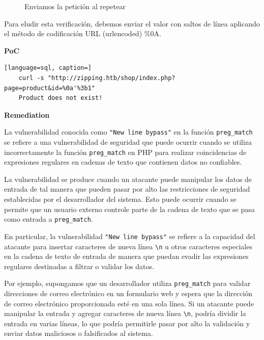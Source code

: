 \documentclass[a4paper]{article} %
\begin{document}
    \begin{figure}[h]
	\centering
	\setlength{\fboxrule}{0.5pt}
	\caption{Enviamos la petición al repetear}
    \end{figure}

    Para eludir esta verificación, debemos enviar el valor con saltos de línea aplicando el método de codificación URL (urlencoded) \%0A.

    \textbf{PoC}

    \begin{lstlisting}[language=sql, caption=]
    curl -s "http://zipping.htb/shop/index.php?page=product&id=%0a'%3b1"
    Product does not exist!
    \end{lstlisting}

    \clearpage
    \textbf{Remediation}

    La vulnerabilidad conocida como \verb|"New line bypass"| en la función \texttt{preg\_match} se refiere a una vulnerabilidad de seguridad que puede ocurrir cuando se utiliza incorrectamente la función \texttt{preg\_match} en PHP para realizar coincidencias de expresiones regulares en cadenas de texto que contienen datos no confiables.

    La vulnerabilidad se produce cuando un atacante puede manipular los datos de entrada de tal manera que pueden pasar por alto las restricciones de seguridad establecidas por el desarrollador del sistema. Esto puede ocurrir cuando se permite que un usuario externo controle parte de la cadena de texto que se pasa como entrada a \texttt{preg\_match}.

    En particular, la vulnerabilidad \verb|"New line bypass"| se refiere a la capacidad del atacante para insertar caracteres de nueva línea \verb|\n| u otros caracteres especiales en la cadena de texto de entrada de manera que puedan evadir las expresiones regulares destinadas a filtrar o validar los datos.

    Por ejemplo, supongamos que un desarrollador utiliza \texttt{preg\_match} para validar direcciones de correo electrónico en un formulario web y espera que la dirección de correo electrónico proporcionada esté en una sola línea. Si un atacante puede manipular la entrada y agregar caracteres de nueva línea \verb|\n|, podría dividir la entrada en varias líneas, lo que podría permitirle pasar por alto la validación y enviar datos maliciosos o falsificados al sistema.
\end{document}
